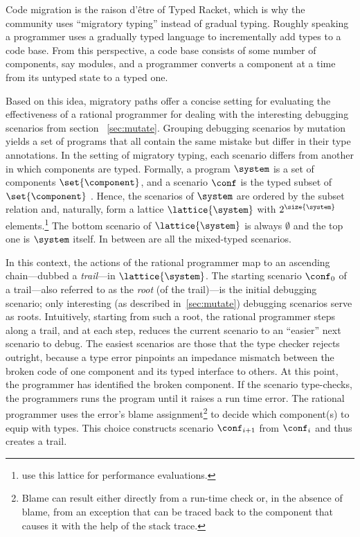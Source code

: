 Code migration is the raison d'\^etre of Typed Racket, which is why the community
uses ``migratory typing'' instead of gradual typing. Roughly speaking a
programmer uses a gradually typed language to incrementally add types to a code
base. From this perspective, a code base consists of some number of components,
say modules, and a programmer converts a component at a time from its untyped
state to a typed one. 

% 

Based on this idea, migratory paths offer a concise setting for
evaluating the effectiveness of a rational programmer for dealing with
the interesting debugging scenarios from section ~\ref{sec:mutate}.
Grouping debugging scenarios by mutation yields a set of programs that
all contain the same mistake but differ in their type annotations.  In
the setting of migratory typing, each scenario differs from another in
which components are typed. Formally, a program $\system$ is a set of
components $\set{\component}$, and a scenario $\conf$ is the typed
subset of $\set{\component}$ . Hence, the scenarios of $\system$ are
ordered by the subset relation and, naturally, form a lattice
$\lattice{\system}$ with $2^{\size{\system}}$
elements.\footnote{\citet{tfgnvf-popl-2016} use this lattice for
performance evaluations.} The bottom scenario of $\lattice{\system}$
is always $\emptyset$ and the top one is $\system$ itself. In between
are all the mixed-typed scenarios.

In this context, the actions of the rational programmer map to an
ascending chain---dubbed a \emph{trail}---in $\lattice{\system}$.  The
starting scenario $\conf_0$ of a trail---also referred to as the
\emph{root} (of the trail)---is the initial debugging scenario; only
interesting (as described in~\ref{sec:mutate}) debugging scenarios
serve as roots.  Intuitively, starting from such a root, the rational
programmer steps along a trail, and at each step, reduces the current
scenario to an ``easier'' next scenario to debug.  The easiest
scenarios are those that the type checker rejects outright, because a
type error pinpoints an impedance mismatch between the broken code of
one component and its typed interface to others. At this point, the
programmer has identified the broken component.  If the scenario
type-checks, the programmers runs the program until it raises a run
time error.  The rational programmer uses the error's blame
assignment\footnote{Blame can result either directly from a run-time
check or, in the absence of blame, from an exception that can be
traced back to the component that causes it with the help of the stack
trace.} to decide which component(s) to equip with types. This choice
constructs scenario $\conf_{i+1}$ from $\conf_{i}$ and thus creates a trail.

